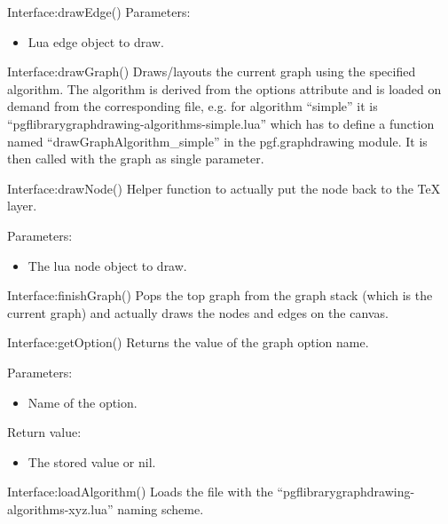 \begin{luacommand}{{Interface:drawEdge}()}
Parameters:
\begin{itemize}
	\item[]  \subitem Lua edge object to draw.
\end{itemize}



\end{luacommand}\begin{luacommand}{{Interface:drawGraph}()}
Draws/layouts the current graph using the specified algorithm.  The algorithm is derived from the options attribute and is loaded on demand from the corresponding file, e.g. for algorithm ``simple'' it is ``pgflibrarygraphdrawing-algorithms-simple.lua'' which has to define a function named ``drawGraphAlgorithm\_simple'' in the pgf.graphdrawing module.  It is then called with the graph as single parameter.



\end{luacommand}\begin{luacommand}{{Interface:drawNode}()}
Helper function to actually put the node back to the TeX layer.

Parameters:
\begin{itemize}
	\item[]  \subitem The lua node object to draw.
\end{itemize}



\end{luacommand}\begin{luacommand}{{Interface:finishGraph}()}
Pops the top graph from the graph stack (which is the current graph) and actually draws the nodes and edges on the canvas.



\end{luacommand}\begin{luacommand}{{Interface:getOption}()}
Returns the value of the graph option name.

Parameters:
\begin{itemize}
	\item[]  \subitem Name of the option.
\end{itemize}


Return value:
\begin{itemize} \item[] The stored value or nil. \end{itemize}


\end{luacommand}\begin{luacommand}{{Interface:loadAlgorithm}()}
Loads the file with the ``pgflibrarygraphdrawing-algorithms-xyz.lua'' naming scheme.


\end{luacommand}
